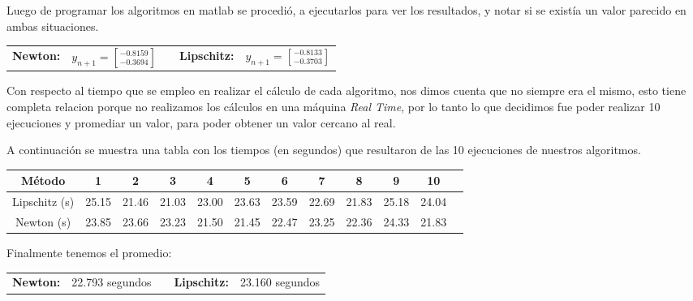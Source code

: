 Luego de programar los algoritmos en matlab se procedió,
a ejecutarlos para ver los resultados, y notar si se existía un
valor parecido en ambas situaciones.

\begin{tabular}{llcll}
	\textbf{Newton:} & $y_{n+1} = {-0.8159 \brack -0.3694}$ & &\textbf{Lipschitz:} & $y_{n+1} = {-0.8133 \brack -0.3703}$ \\
\end{tabular}

Con respecto al tiempo que se empleo en realizar el cálculo
de cada algoritmo, nos dimos cuenta que no siempre era el mismo,
esto tiene completa relacion porque no realizamos los cálculos
en una máquina \emph{Real Time}, por lo tanto lo que decidimos
fue poder realizar 10 ejecuciones y promediar un valor,
para poder obtener un valor cercano al real.

A continuación se muestra una tabla con los tiempos (en segundos) 
que resultaron de las 10 ejecuciones de nuestros algoritmos.
\begin{center}
\begin{tabular}{|c|c|c|c|c|c|c|c|c|c|c|c|}
	\hline
	Método & 1 & 2 & 3 & 4 & 5 & 6 & 7 & 8 & 9 & 10  \\\hline 
	Lipschitz (s) & 25.15 & 21.46 & 21.03 & 23.00 & 23.63 & 23.59 & 22.69 & 21.83 & 25.18 & 24.04  \\\hline
	Newton (s)    & 23.85 & 23.66 & 23.23 & 21.50 & 21.45 & 22.47 & 23.25 & 22.36 & 24.33 & 21.83  \\\hline
\end{tabular}
\end{center}
Finalmente tenemos el promedio:
\begin{tabular}{llcll}
	\textbf{Newton:} & 22.793 segundos & &\textbf{Lipschitz:} & 23.160 segundos \\
\end{tabular}
